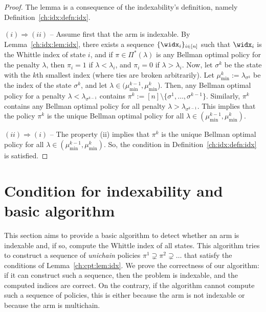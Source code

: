 \begin{proof}
    The lemma is a consequence of the indexability's definition, namely Definition~\ref{ch:idx:defn:idx}.

    $(i)\Rightarrow(ii)$ -- Assume first that the arm is indexable.
    By Lemma~\ref{ch:idx:lem:idx}, there exists a sequence $\{\widx_i\}_{i\in[n]}$ such that $\widx_i$ is the Whittle index of state $i$, and if $\pi\in\Pi^*(\lambda)$ is any Bellman optimal policy for the penalty $\lambda$, then $\pi_i=1$ if $\lambda<\lambda_i$, and $\pi_i=0$ if $\lambda>\lambda_i$.
    Now, let $\sigma^k$ be the state with the $k$th smallest index (where ties are broken arbitrarily).
    Let $\mu^k_{\min}:=\lambda_{\sigma^k}$ be the index of the state $\sigma^k$, and let $\lambda\in(\mu^{k-1}_{\min},\mu^{k}_{\min}$).
    Then, any Bellman optimal policy for a penalty $\lambda<\lambda_{\sigma^{k-1}}$ contains $\pi^{k}:=[n]\setminus\{\sigma^1,\dots, \sigma^{k-1}\}$.
    Similarly, $\pi^{k}$ contains any Bellman optimal policy for all penalty $\lambda>\lambda_{\sigma^{k-1}}$.
    This implies that the policy $\pi^{k}$ is the unique Bellman optimal policy for all $\lambda\in(\mu^{k-1}_{\min},\mu^{k}_{\min})$. 

    $(ii)\Rightarrow(i)$ -- The property (ii) implies that $\pi^k$ is the unique Bellman optimal policy for all $\lambda\in(\mu^{k-1}_{\min},\mu^k_{\min})$. 
    So, the condition in Definition~\ref{ch:idx:defn:idx} is satisfied.
\end{proof}

\section{Condition for indexability and basic algorithm}
\label{sec:widx_compute}

This section aims to provide a basic algorithm to detect whether an arm is indexable and, if so, compute the Whittle index of all states.
This algorithm tries to construct a sequence of \emph{unichain} policies $\pi^1\supsetneq \pi^2\supsetneq\dots$ that satisfy the conditions of Lemma~\ref{ch:cpt:lem:idx}.
We prove the correctness of our algorithm: if it can construct such a sequence, then the problem is indexable, and the computed indices are correct.
On the contrary, if the algorithm cannot compute such a sequence of policies, this is either because the arm is not indexable or because the arm is multichain.
